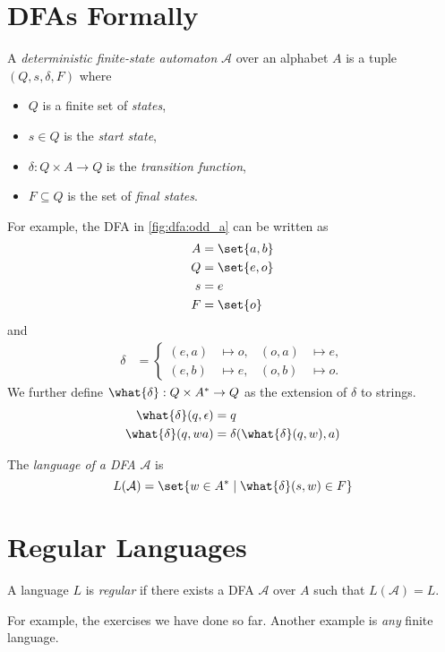 \section{DFAs Formally} \label{sec:dfa:formal}
\begin{definition*}[DFA] \label{def:dfa}
    A \emph{deterministic finite-state automaton} $\mathcal{A}$ over an
    alphabet $A$ is a tuple $(Q, s, \delta, F)$ where
    \begin{itemize}
        \item $Q$ is a finite set of \emph{states},
        \item $s \in Q$ is the \emph{start state},
        \item $\delta: Q \times A \to Q$ is the \emph{transition function},
        \item $F \subseteq Q$ is the set of \emph{final states}.
    \end{itemize}
\end{definition*}
For example, the DFA in \cref{fig:dfa:odd_a} can be written as
\begin{align*}
    A &= \set{a, b} \\
    Q &= \set{e, o} \\
    s &= e \\
    F &= \set{o}
\end{align*} and \begin{align*}
    \delta &= \left\{\begin{aligned}
        (e, a) &\mapsto o, & (o, a) &\mapsto e, \\
        (e, b) &\mapsto e, & (o, b) &\mapsto o.
    \end{aligned}\right.
\end{align*}
We further define $\what{\delta} : Q \times A^* \to Q$ as the extension of
$\delta$ to strings.
\begin{align*}
    \what{\delta}(q, \epsilon) &= q \\
    \what{\delta}(q, wa) &= \delta(\what{\delta}(q, w), a)
\end{align*}
\begin{definition*} \label{def:dfa:lang}
    The \emph{language of a DFA} $\mathcal{A}$ is
    \begin{equation*}
        L(\mathcal{A}) = \set{w \in A^* \mid \what{\delta}(s, w) \in F}
    \end{equation*}
\end{definition*}

\section{Regular Languages} \label{sec:dfa:regular}
\begin{definition*} \label{def:regular}
    A language $L$ is \emph{regular} if there exists a DFA $\mathcal{A}$
    over $A$ such that $L(\mathcal{A}) = L$.
\end{definition*}
For example, the exercises we have done so far.
Another example is \emph{any} finite language.


